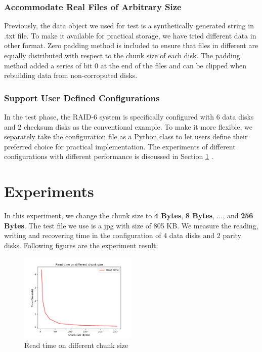 \documentclass[journal]{IEEEtran}
\begin{document}
\subsubsection{Accommodate Real Files of Arbitrary Size} Previously, the data object we used for test is a synthetically generated string in .txt file. To make it available for practical storage, we have tried different data in other format. Zero padding method is included to ensure that files in different are equally distributed with respect to the chunk size of each disk. The padding  method added a series of bit 0 at the end of the files and can be clipped when rebuilding data from non-corroputed disks.

\subsubsection{Support User Defined Configurations } In the test phase, the RAID-6 system is specifically configured with 6 data disks and 2 checksum disks as the conventional example.  To make it more flexible, we separately take the configuration file as a Python class to let users define their preferred choice for practical implementation. The experiments of different configurations with different performance is discussed in Section \ref{sec5} . 

\section{Experiments}

\label{sec5}

In this experiment, we change the chunk size to \textbf{4 Bytes}, \textbf{8 Bytes}, ..., and \textbf{256 Bytes}. The test file we use is a jpg with size of 805 KB. We measure the reading, writing and recovering time in the configuration of 4 data disks and 2 parity disks. Following figures are the experiment result:


\begin{figure}[htbp]

	\centering

	\captionsetup{justification=centering}

	\includegraphics[width=0.5\textwidth]{fig/result_read.png}

	\caption{Read time on different chunk size}

\end{figure}
\end{document}
